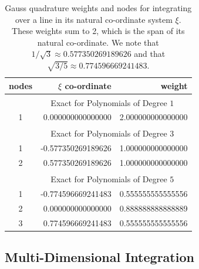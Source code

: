 \begin{table}
    \centering
    \begin{tabular}{|c|rr|}
        \hline
        nodes & \centering $\xi$ co-ordinate \phantom{123}  & 
        weight \phantom{123456} \\ \hline
        & \multicolumn{2}{|c|}{Exact for Polynomials of Degree $1^{\phantom{|^|}}$} \\ 
        \hline
        1 & 0.000000000000000 & 2.000000000000000 \\ 
        \hline
        & \multicolumn{2}{|c|}{Exact for Polynomials of Degree $3^{\phantom{|^|}}$} \\ \hline
        1 & -0.577350269189626 & 1.000000000000000 \\
        2 & 0.577350269189626 & 1.000000000000000 \\ 
        \hline
        & \multicolumn{2}{|c|}{Exact for Polynomials of Degree $5^{\phantom{|^|}}$} \\ \hline
        1 & -0.774596669241483 & 0.555555555555556 \\
        2 & 0.000000000000000 & 0.888888888888889 \\
        3 & 0.774596669241483 & 0.555555555555556 \\ 
        \hline
    \end{tabular}
    \caption{Gauss quadrature weights and nodes for integrating over a line in its natural co-ordinate system $\xi$.  These weights sum to 2, which is the span of its natural co-ordinate.  We note that $1/\sqrt{3} \approx 0.577350269189626$ and that $\sqrt{3/5} \approx 0.774596669241483$.}
    \label{tabQuadrature1D}
\end{table}


\subsection{Multi-Dimensional Integration}

